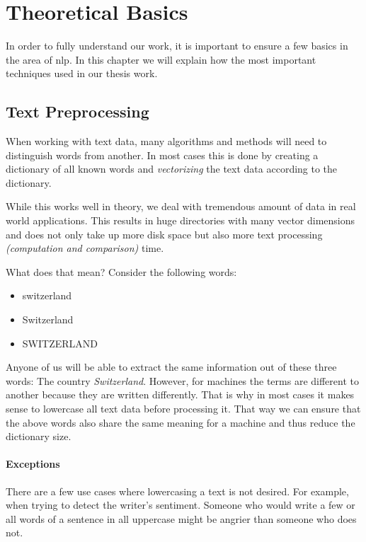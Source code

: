 \section{Theoretical Basics}
\label{sec:3_theoretical_basics}

In order to fully understand our work,
it is important to ensure a few basics in the area of \Gls{nlp}.
In this chapter we will explain how the most important techniques used in our thesis work.

\subsection{Text Preprocessing}
\label{subsec:3_text_preprocessing}

When working with text data, many algorithms and methods will need to distinguish words from another.
In most cases this is done by creating a dictionary of all known words and \textit{vectorizing} the text data
according to the dictionary.

While this works well in theory, we deal with tremendous amount of data in real world applications.
This results in huge directories with many vector dimensions and does not only take up more disk space
but also more text processing \textit{(computation and comparison)} time.

What does that mean?
Consider the following words:

\begin{itemize}
    \item switzerland
    \item Switzerland
    \item SWITZERLAND
\end{itemize}

Anyone of us will be able to extract the same information out of these three words:
The country \textit{Switzerland}.
However, for machines the terms are different to another because they are written differently.
That is why in most cases it makes sense to lowercase all text data before processing it.
That way we can ensure that the above words also share the same meaning
for a machine and thus reduce the dictionary size.

\paragraph{Exceptions}
There are a few use cases where lowercasing a text is not desired.
For example, when trying to detect the writer's sentiment.
Someone who would write a few or all words of a sentence in all uppercase
might be angrier than someone who does not.

